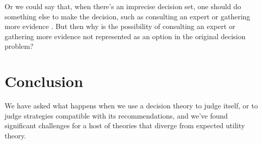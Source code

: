 \documentclass[a4paper,final]{article}
\newcommand\U{\mathfrak{U}} %
\newcommand{\todoold}[2][]{\todo[backgroundcolor=white,bordercolor=orange!10,linecolor=gray!10, #1,caption={},textcolor=gray]{Pre-rev: #2}}
\newcommand{\todooldinfo}[2][]{\todoold[#1]{#2}}
\renewcommand{\color}[1]{}
\newenvironment{colored}[1]{\leavevmode\color{#1}}{}
\newcommand\SetDelimiter[1][]{
	\nonscript\,#1\vert \allowbreak \nonscript\,\mathopen{}}
\providecommand\given{\SetDelimiter}
\newenvironment{CCM rewritten}
{\begingroup\color{blue}} %
{\endgroup}              %
\begin{document}
Or we could say that, when there's an imprecise decision set, one should do something else to make the decision, such as consulting an expert or gathering more evidence \citep{de2014efficient}. But then why is the possibility of consulting an expert or gathering more evidence not represented as an option in the original decision problem?




%
%
%
%
%



\section{Conclusion}


We have asked what happens when we use a decision theory to judge itself, or to judge strategies compatible with its recommendations, and we've found significant challenges for a host of theories that diverge from expected utility theory. 
\end{document}
